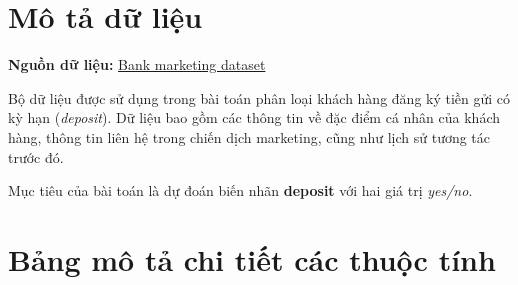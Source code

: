 \section{Mô tả dữ liệu}

\textbf{Nguồn dữ liệu:} \href{https://www.kaggle.com/datasets/janiobachmann/bank-marketing-dataset}{Bank marketing dataset}


Bộ dữ liệu được sử dụng trong bài toán phân loại khách hàng đăng ký tiền gửi có kỳ hạn (\textit{deposit}). 
Dữ liệu bao gồm các thông tin về đặc điểm cá nhân của khách hàng, thông tin liên hệ trong chiến dịch marketing, 
cũng như lịch sử tương tác trước đó. 

Mục tiêu của bài toán là dự đoán biến nhãn \textbf{deposit} với hai giá trị \textit{yes/no}.

\section{Bảng mô tả chi tiết các thuộc tính}

